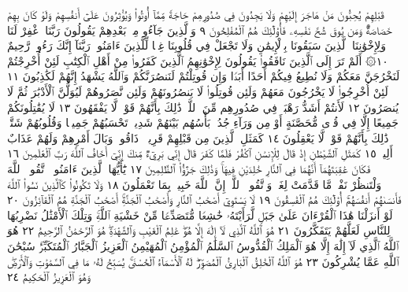 قَبْلِهِمْ يُحِبُّونَ مَنْ هَاجَرَ إِلَيْهِمْ وَلَا يَجِدُونَ فِي صُدُورِهِمْ
حَاجَةࣰ مِّمَّآ أُوتُوا۟ وَيُؤْثِرُونَ عَلَىٰٓ أَنفُسِهِمْ وَلَوْ كَانَ بِهِمْ خَصَاصَةࣱۚ
وَمَن يُوقَ شُحَّ نَفْسِهِۦ فَأُو۟لَٰٓئِكَ هُمُ ٱلْمُفْلِحُونَ ٩
وَٱلَّذِينَ جَآءُو مِنۢ بَعْدِهِمْ يَقُولُونَ رَبَّنَا ٱغْفِرْ لَنَا وَلِإِخْوَٰنِنَا
ٱلَّذِينَ سَبَقُونَا بِٱلْإِيمَٰنِ وَلَا تَجْعَلْ فِي قُلُوبِنَا غِلࣰّا لِّلَّذِينَ
ءَامَنُوا۟ رَبَّنَآ إِنَّكَ رَءُوفࣱ رَّحِيمٌ ١٠۞ أَلَمْ تَرَ إِلَى ٱلَّذِينَ
نَافَقُوا۟ يَقُولُونَ لِإِخْوَٰنِهِمُ ٱلَّذِينَ كَفَرُوا۟ مِنْ أَهْلِ ٱلْكِتَٰبِ
لَئِنْ أُخْرِجْتُمْ لَنَخْرُجَنَّ مَعَكُمْ وَلَا نُطِيعُ فِيكُمْ أَحَدًا أَبَدࣰا
وَإِن قُوتِلْتُمْ لَنَنصُرَنَّكُمْ وَٱللَّهُ يَشْهَدُ إِنَّهُمْ لَكَٰذِبُونَ ١١
لَئِنْ أُخْرِجُوا۟ لَا يَخْرُجُونَ مَعَهُمْ وَلَئِن قُوتِلُوا۟ لَا يَنصُرُونَهُمْ
وَلَئِن نَّصَرُوهُمْ لَيُوَلُّنَّ ٱلْأَدْبَٰرَ ثُمَّ لَا يُنصَرُونَ ١٢ لَأَنتُمْ
أَشَدُّ رَهْبَةࣰ فِي صُدُورِهِم مِّنَ ٱللَّهِۚ ذَٰلِكَ بِأَنَّهُمْ قَوْمࣱ
لَّا يَفْقَهُونَ ١٣ لَا يُقَٰتِلُونَكُمْ جَمِيعًا إِلَّا فِي قُرࣰى مُّحَصَّنَةٍ
أَوْ مِن وَرَآءِ جُدُرِۭۚ بَأْسُهُم بَيْنَهُمْ شَدِيدࣱۚ تَحْسَبُهُمْ جَمِيعࣰا
وَقُلُوبُهُمْ شَتَّىٰۚ ذَٰلِكَ بِأَنَّهُمْ قَوْمࣱ لَّا يَعْقِلُونَ ١٤ كَمَثَلِ
ٱلَّذِينَ مِن قَبْلِهِمْ قَرِيبࣰاۖ ذَاقُوا۟ وَبَالَ أَمْرِهِمْ وَلَهُمْ عَذَابٌ
أَلِيمࣱ ١٥ كَمَثَلِ ٱلشَّيْطَٰنِ إِذْ قَالَ لِلْإِنسَٰنِ ٱكْفُرْ فَلَمَّا
كَفَرَ قَالَ إِنِّي بَرِيٓءࣱ مِّنكَ إِنِّيٓ أَخَافُ ٱللَّهَ رَبَّ ٱلْعَٰلَمِينَ ١٦
فَكَانَ عَٰقِبَتَهُمَآ أَنَّهُمَا فِي ٱلنَّارِ خَٰلِدَيْنِ فِيهَاۚ
وَذَٰلِكَ جَزَٰٓؤُا۟ ٱلظَّٰلِمِينَ ١٧ يَٰٓأَيُّهَا ٱلَّذِينَ ءَامَنُوا۟
ٱتَّقُوا۟ ٱللَّهَ وَلْتَنظُرْ نَفْسࣱ مَّا قَدَّمَتْ لِغَدࣲۖ وَٱتَّقُوا۟ ٱللَّهَۚ إِنَّ
ٱللَّهَ خَبِيرُۢ بِمَا تَعْمَلُونَ ١٨ وَلَا تَكُونُوا۟ كَٱلَّذِينَ
نَسُوا۟ ٱللَّهَ فَأَنسَىٰهُمْ أَنفُسَهُمْۚ أُو۟لَٰٓئِكَ هُمُ ٱلْفَٰسِقُونَ ١٩
لَا يَسْتَوِيٓ أَصْحَٰبُ ٱلنَّارِ وَأَصْحَٰبُ ٱلْجَنَّةِۚ أَصْحَٰبُ
ٱلْجَنَّةِ هُمُ ٱلْفَآئِزُونَ ٢٠ لَوْ أَنزَلْنَا هَٰذَا ٱلْقُرْءَانَ
عَلَىٰ جَبَلࣲ لَّرَأَيْتَهُۥ خَٰشِعࣰا مُّتَصَدِّعࣰا مِّنْ خَشْيَةِ ٱللَّهِۚ
وَتِلْكَ ٱلْأَمْثَٰلُ نَضْرِبُهَا لِلنَّاسِ لَعَلَّهُمْ يَتَفَكَّرُونَ ٢١
هُوَ ٱللَّهُ ٱلَّذِي لَآ إِلَٰهَ إِلَّا هُوَۖ عَٰلِمُ ٱلْغَيْبِ وَٱلشَّهَٰدَةِۖ
هُوَ ٱلرَّحْمَٰنُ ٱلرَّحِيمُ ٢٢ هُوَ ٱللَّهُ ٱلَّذِي لَآ إِلَٰهَ إِلَّا هُوَ ٱلْمَلِكُ
ٱلْقُدُّوسُ ٱلسَّلَٰمُ ٱلْمُؤْمِنُ ٱلْمُهَيْمِنُ ٱلْعَزِيزُ ٱلْجَبَّارُ
ٱلْمُتَكَبِّرُۚ سُبْحَٰنَ ٱللَّهِ عَمَّا يُشْرِكُونَ ٢٣ هُوَ ٱللَّهُ
ٱلْخَٰلِقُ ٱلْبَارِئُ ٱلْمُصَوِّرُۖ لَهُ ٱلْأَسْمَآءُ ٱلْحُسْنَىٰۚ يُسَبِّحُ
لَهُۥ مَا فِي ٱلسَّمَٰوَٰتِ وَٱلْأَرْضِۖ وَهُوَ ٱلْعَزِيزُ ٱلْحَكِيمُ ٢٤
